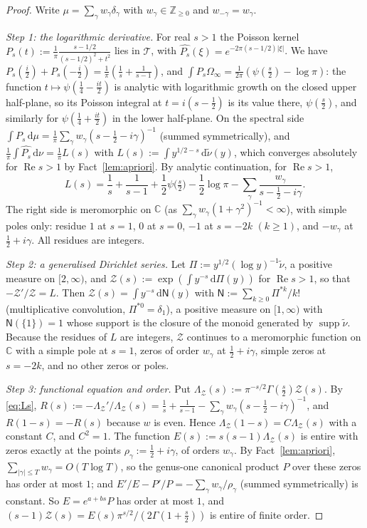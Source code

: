 \documentclass[11pt]{amsart}
\newcommand{\ZZ}{\mathbb Z}
\newcommand{\CC}{\mathbb C}
\newcommand{\dd}{\,\mathrm d}
\renewcommand{\Re}{\operatorname{Re}}
\newcommand{\supp}{\operatorname{supp}}
\newcommand{\Oinf}{\Omega_\infty}
\newcommand{\Tc}{\mathcal T}
\theoremstyle{definition}
\theoremstyle{remark}
\numberwithin{equation}{section}
\begin{document}
\begin{proof}
Write $\mu=\sum_\gamma w_\gamma\delta_\gamma$ with $w_\gamma\in\ZZ_{\ge0}$ and $w_{-\gamma}=w_\gamma$.

\emph{Step 1: the logarithmic derivative.} For real $s>1$ the Poisson kernel
$P_s(t):=\frac1\pi\frac{s-1/2}{(s-1/2)^2+t^2}$ lies in $\Tc$, with $\widehat{P_s}(\xi)=e^{-2\pi(s-1/2)|\xi|}$. We have
$P_s(\frac i2)+P_s(-\frac i2)=\frac1\pi(\frac1s+\frac1{s-1})$, and $\int P_s\Oinf=\frac1{2\pi}(\psi(\frac s2)-\log\pi)$: the function
$t\mapsto\psi(\frac14-\frac{it}2)$ is analytic with logarithmic growth on the closed upper half-plane, so its Poisson integral at
$t=i(s-\frac12)$ is its value there, $\psi(\frac s2)$, and similarly for $\psi(\frac14+\frac{it}2)$ in the lower half-plane. On the
spectral side $\int P_s\dd\mu=\frac1\pi\sum_\gamma w_\gamma(s-\frac12-i\gamma)^{-1}$ (summed symmetrically), and
$\frac1\pi\int\widehat{P_s}\dd\nu=\frac1\pi L(s)$ with $L(s):=\int y^{1/2-s}\dd\tilde\nu(y)$, which converges absolutely for $\Re s>1$ by
Fact~\ref{lem:apriori}. By analytic continuation, for $\Re s>1$,
\begin{equation}\label{eq:Ls}
L(s)=\frac1s+\frac1{s-1}+\frac12\psi\big(\tfrac s2\big)-\frac12\log\pi-\sum_\gamma\frac{w_\gamma}{s-\frac12-i\gamma}.
\end{equation}
The right side is meromorphic on $\CC$ (as $\sum_\gamma w_\gamma(1+\gamma^2)^{-1}<\infty$), with simple poles only: residue $1$ at
$s=1$, $0$ at $s=0$, $-1$ at $s=-2k$ $(k\ge1)$, and $-w_\gamma$ at $\frac12+i\gamma$. All residues are integers.

\emph{Step 2: a generalised Dirichlet series.} Let $\Pi:=y^{1/2}(\log y)^{-1}\tilde\nu$, a positive measure on $[2,\infty)$, and
$\mathcal Z(s):=\exp(\int y^{-s}\dd\Pi(y))$ for $\Re s>1$, so that $-\mathcal Z'/\mathcal Z=L$. Then $\mathcal Z(s)=\int y^{-s}\dd\mathsf N(y)$
with $\mathsf N:=\sum_{k\ge0}\Pi^{*k}/k!$ (multiplicative convolution, $\Pi^{*0}=\delta_1$), a positive measure on $[1,\infty)$ with
$\mathsf N(\{1\})=1$ whose support is the closure of the monoid generated by $\supp\tilde\nu$. Because the residues of $L$
are integers, $\mathcal Z$ continues to a meromorphic function on $\CC$ with a simple pole at $s=1$, zeros of order $w_\gamma$ at
$\frac12+i\gamma$, simple zeros at $s=-2k$, and no other zeros or poles.

\emph{Step 3: functional equation and order.} Put $\Lambda_{\mathcal Z}(s):=\pi^{-s/2}\Gamma(\frac s2)\mathcal Z(s)$. By \eqref{eq:Ls},
$R(s):=-\Lambda_{\mathcal Z}'/\Lambda_{\mathcal Z}(s)=\frac1s+\frac1{s-1}-\sum_\gamma w_\gamma(s-\frac12-i\gamma)^{-1}$, and $R(1-s)=-R(s)$
because $w$ is even. Hence $\Lambda_{\mathcal Z}(1-s)=C\Lambda_{\mathcal Z}(s)$ with a constant $C$, and $C^2=1$. The function
$E(s):=s(s-1)\Lambda_{\mathcal Z}(s)$ is entire with zeros exactly at the points $\rho_\gamma:=\frac12+i\gamma$, of orders $w_\gamma$. By
Fact~\ref{lem:apriori}, $\sum_{|\gamma|\le T}w_\gamma=O(T\log T)$, so the genus-one canonical product $P$ over these zeros has order at
most $1$; and $E'/E-P'/P=-\sum_\gamma w_\gamma/\rho_\gamma$ (summed symmetrically) is constant. So $E=e^{a+bs}P$ has order at most $1$,
and $(s-1)\mathcal Z(s)=E(s)\pi^{s/2}/(2\Gamma(1+\frac s2))$ is entire of finite order.


\end{proof}
\end{document}
